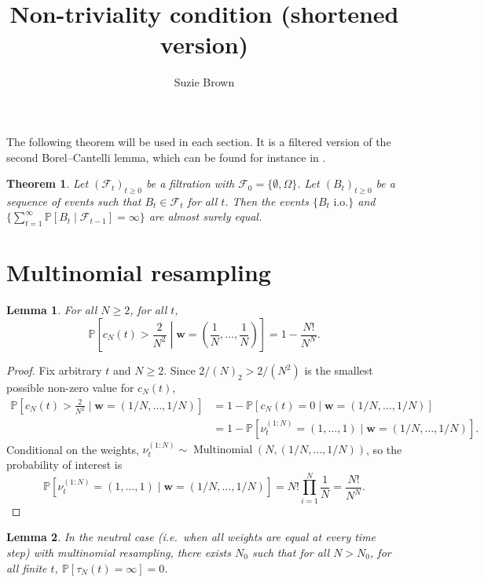 \documentclass{article}
\title{Non-triviality condition (shortened version)}
\author{Suzie Brown}
\newtheorem{thm}{Theorem}
\newtheorem{lemma}{Lemma}
\newcommand{\PR}{\mathbb{P}}
\newcommand{\1}[1]{\mathbb{I}_{#1}}
\newcommand{\Mn}{\operatorname{Multinomial}}
\begin{document}
\maketitle
\thispagestyle{fancy}

The following theorem will be used in each section. It is a filtered version of the second Borel--Cantelli lemma, which can be found for instance in \citet[Theorem 4.3.4]{durrett2019}.
\begin{thm}
Let $ (\mathcal{F}_t)_{t\geq 0}$ be a filtration with $\mathcal{F}_0 = \{\emptyset, \Omega\}$. Let $(B_t)_{t\geq 0}$ be a sequence of events such that $B_t \in \mathcal{F}_t$ for all $t$.
Then the events $\{ B_t \text{ i.o.} \}$ and $\{ \sum_{t=1}^\infty \PR[B_t \mid \mathcal{F}_{t-1} ] =\infty \}$ are almost surely equal.
\end{thm}


\section*{Multinomial resampling}

\begin{lemma}\label{lem:neutral_cN_LB}
For all $N\geq 2$, for all $t$,
\begin{equation*}
\PR \left[c_N(t) > \frac{2}{N^2} \middle| \mathbf{w}=\left( \frac{1}{N}, \dots, \frac{1}{N} \right) \right] 
= 1- \frac{N!}{N^N}.
\end{equation*}
\end{lemma}

\begin{proof}
Fix arbitrary $t$ and $N\geq 2$. Since $2/(N)_2 > 2/(N^2)$ is the smallest possible non-zero value for $c_N(t)$,
\begin{align*}
\PR \left[c_N(t) > \frac{2}{N^2} \mid \mathbf{w}=(1/N, \dots, 1/N) \right]
&= 1- \PR[c_N(t) = 0  \mid \mathbf{w}=(1/N, \dots, 1/N)] \\
&= 1- \PR[\nu_t^{(1:N)} = (1,\dots, 1) \mid \mathbf{w}=(1/N, \dots, 1/N)].
\end{align*}
Conditional on the weights, $\nu_t^{(1:N)} \sim \Mn(N, (1/N, \dots, 1/N))$, so the probability of interest is
\begin{equation*}
\PR[\nu_t^{(1:N)} = (1,\dots, 1) \mid \mathbf{w}=(1/N, \dots, 1/N)] =
N! \prod_{i=1}^N \frac{1}{N}
= \frac{N!}{N^N}.
\end{equation*}
\end{proof}


\begin{lemma}\label{thm:nontrivial_mn_optimalw}
In the neutral case (i.e.\ when all weights are equal at every time step) with multinomial resampling, there exists $N_0$ such that for all $N>N_0$, for all finite $t$, $\PR[\tau_N(t) = \infty] =0$.
\end{lemma}
\end{document}
